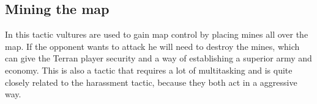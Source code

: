 	\subsection{Mining the map}
		In this tactic vultures are used to gain map control by placing mines all over the map. If the opponent wants to attack he will need to destroy the 
		mines, which can give the Terran player security and a way of establishing a superior army and economy. 
		This is also a tactic that requires a lot of multitasking and is quite closely related to the harassment tactic, because they both act in a 
		aggressive way.
		
	
		
		
		